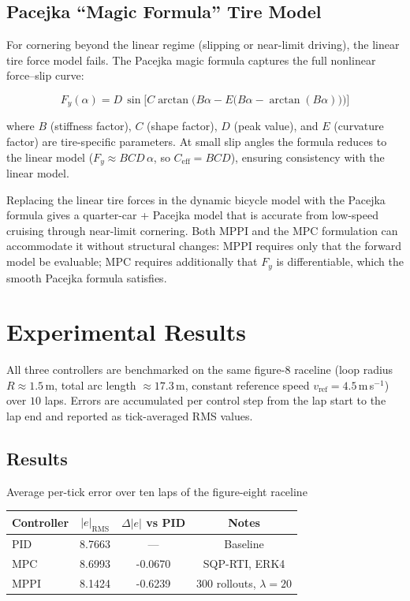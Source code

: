 \documentclass[11pt]{article}
\begin{document}
\subsection{Pacejka ``Magic Formula'' Tire Model}

For cornering beyond the linear regime (slipping or near-limit driving), the
linear tire force model fails.  The Pacejka magic formula captures the full nonlinear force--slip curve:

\[
F_y(\alpha) = D\,\sin\!\Big[C\arctan\!\Big(B\alpha - E\big(B\alpha - \arctan(B\alpha)\big)\Big)\Big]
\]

where $B$ (stiffness factor), $C$ (shape factor), $D$ (peak value), and $E$
(curvature factor) are tire-specific parameters.  At small slip angles the
formula reduces to the linear model ($F_y \approx BCD\,\alpha$, so
$C_{\text{eff}} = BCD$), ensuring consistency with the linear model.

Replacing the linear tire forces in the dynamic bicycle model with the Pacejka
formula gives a quarter-car + Pacejka model that is accurate from
low-speed cruising through near-limit cornering.  Both MPPI and the MPC
formulation can accommodate it without structural changes: MPPI requires only
that the forward model be evaluable; MPC requires additionally that $F_y$ is
differentiable, which the smooth Pacejka formula satisfies.


\section{Experimental Results}

All three controllers are benchmarked on the same figure-8 raceline (loop
radius $R \approx 1.5$\,m, total arc length $\approx 17.3$\,m, constant
reference speed $v_{\text{ref}} = 4.5$\,m\,s$^{-1}$) over $10$ laps.
Errors are accumulated per control step from the lap start to the lap end
and reported as tick-averaged RMS values.

\subsection{Results}
Average per-tick error over ten laps of the figure-eight raceline

\begin{center}
\begin{tabular}{lccc}
\toprule
Controller & $|e|_{\text{RMS}}$&$\Delta |e|$ vs PID& Notes \\
\midrule
PID  & 8.7663 &---& Baseline \\
MPC  & 8.6993 & -0.0670 & SQP-RTI, ERK4 \\
MPPI & 8.1424 & -0.6239 & 300 rollouts, $\lambda = 20$ \\

\bottomrule
\end{tabular}
\end{center}
\end{document}

